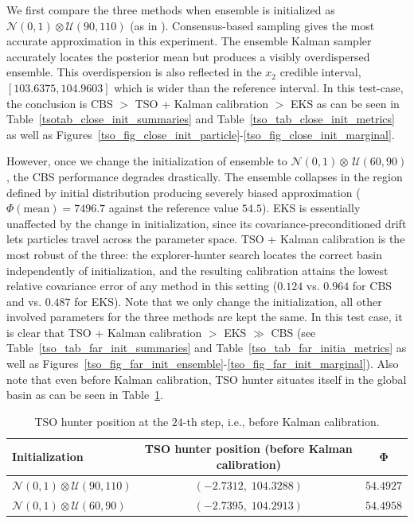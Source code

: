 \documentclass{article}
\numberwithin{equation}{section}
\begin{document}
We first compare the three methods when ensemble is initialized as $\mathcal{N}(0,1)\otimes \mathcal{U}(90,110)$ (as in \cite{carrillo2022consensus_sampling}). Consensus-based sampling gives the most accurate approximation in this experiment. The ensemble Kalman sampler accurately locates the posterior mean but produces a visibly overdispersed ensemble. This overdispersion is also reflected in the $x_2$ credible interval, $[103.6375,104.9603]$
 which is wider than the reference interval.  In this test-case, the conclusion is CBS $>$ TSO + Kalman calibration $>$ EKS as can be seen in Table~\ref{tsotab_close_init_summaries} and Table~\ref{tso_tab_close_init_metrics} as well as Figures~\ref{tso_fig_close_init_particle}-\ref{tso_fig_close_init_marginal}. 
 
 However, once we change the initialization of ensemble to $\mathcal{N}(0,1)\otimes\, \mathcal{U}(60,90)$, the CBS performance degrades drastically. The ensemble collapses in the region defined by initial distribution producing severely biased approximation ($\Phi(\text{mean}) = 7496.7$ against the reference value $54.5$). EKS is essentially unaffected by the change in initialization, since its covariance-preconditioned drift lets particles travel across the parameter space.  
 TSO + Kalman calibration is the most robust of the three: the explorer-hunter search locates the correct basin independently of initialization, and the resulting calibration attains the lowest relative covariance error of any method in this setting ($0.124$ vs. $0.964$ for CBS and vs. $0.487$ for EKS).  
 Note that we only change the initialization, all other involved parameters for the three methods are kept the same. In this test case, it is clear that TSO + Kalman calibration $>$ EKS $\gg$ CBS (see Table~\ref{tso_tab_far_init_summaries} and  Table~\ref{tso_tab_far_initia_metrics} as well as Figures~\ref{tso_fig_far_init_ensemble}-\ref{tso_fig_far_init_marginal}). 
 Also note that even before Kalman calibration, TSO hunter situates itself in the global basin as can be seen in Table~\ref{tso_tab_hunter_position_before_kalman}. 

 

 \begin{table}[H]
\centering
\caption{TSO hunter position at the $24$-th step, i.e., before Kalman calibration.}
\label{tso_tab_hunter_position_before_kalman}
\scriptsize
\renewcommand{\arraystretch}{1.20}
\begin{tabular}{@{}lcc@{}}
\toprule
\textbf{Initialization}
&
\textbf{TSO hunter position} (before Kalman calibration)
&
$\boldsymbol{\Phi}$
\\
\midrule

$\mathcal{N}(0,1)\otimes\mathcal{U}(90,110)$
&
$(-2.7312,\;104.3288)$
&
$54.4927$
\\

$\mathcal{N}(0,1)\otimes\mathcal{U}(60,90)$
&
$(-2.7395,\;104.2913)$
&
$54.4958$
\\

\bottomrule
\end{tabular}
\end{table}
 
\end{document}
